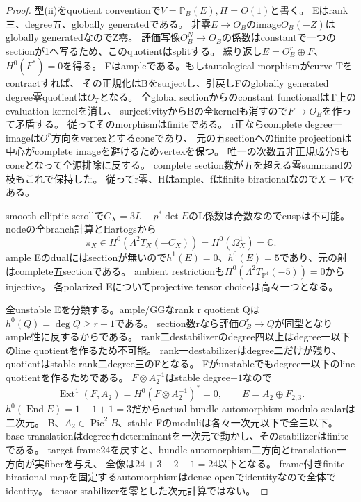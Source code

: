 \documentclass[a4paper,11pt]{ltjsarticle}
\theoremstyle{definition}
\begin{document}
\begin{proof}
型(ii)をquotient conventionで$V=\mathbb P_B(E),H=O(1)$と書く。
Eはrank三、degree五、globally generatedである。
非零$E\to O_B$のimage$O_B(-Z)$はglobally generatedなのでZ零。
評価写像$O_B^N\to O_B$の係数はconstantで一つのsectionが1へ写るため、このquotientはsplitする。
繰り返し$E=O_B^r\oplus F$、$H^0(F^*)=0$を得る。
Fはampleである。もしtautological morphismがcurve Tをcontractすれば、
その正規化はBをsurjectし、引戻しFのglobally generated degree零quotientは$O_T$となる。
全global sectionからのconstant functionalはT上のevaluation kernelを消し、
surjectivityからBの全kernelも消すので$F\to O_B$を作って矛盾する。
従ってそのmorphismはfiniteである。
r正ならcomplete degree一imageは$O^r$方向をvertexとするconeであり、
元の五sectionへのfinite projectionは中心がcomplete imageを避けるためvertexを保つ。
唯一の次数五非正規成分Sもconeとなって全源排除に反する。
complete section数が五を超える零summandの枝もこれで保持した。
従ってr零、Hはample、fはfinite birationalなので$X=V$である。

smooth elliptic scrollで$C_X=3L-p^*\det E$のL係数は奇数なのでcuspは不可能。
nodeの全branch計算とHartogsから
\[
 \pi_X\in H^0(\Lambda^2T_X(-C_X))=H^0(\Omega_X^1)=\mathbb C.
\]
ample Eのdualにはsectionが無いので$h^1(E)=0$、$h^0(E)=5$であり、元の射はcomplete五sectionである。
ambient restrictionも$H^0(\Lambda^2T_{\mathbb P^4}(-5))=0$からinjective。
各polarized Eについてprojective tensor choiceは高々一つとなる。

全unstable Eを分類する。ample/GGなrank r quotient Qは$h^0(Q)=\deg Q\ge r+1$である。
section数rなら評価$O_B^r\to Q$が同型となりample性に反するからである。
rank二destabilizerのdegree四以上はdegree一以下のline quotientを作るため不可能。
rank一destabilizerはdegree二だけが残り、quotientはstable rank二degree三のFとなる。
Fがunstableでもdegree一以下のline quotientを作るためである。
$F\otimes A_2^{-1}$はstable degree$-1$なので
\[
 \operatorname{Ext}^1(F,A_2)=H^0(F\otimes A_2^{-1})^*=0,\qquad
 E=A_2\oplus F_{2,3}.
\]
$h^0(\operatorname{End}E)=1+1+1=3$だからactual bundle automorphism modulo scalarは二次元。
B、$A_2\in\operatorname{Pic}^2B$、stable Fのmoduliは各々一次元以下で全三以下。
base translationはdegree五determinantを一次元で動かし、そのstabilizerはfiniteである。
target frame24を戻すと、bundle automorphism二方向とtranslation一方向が実fiberを与え、
全像は$24+3-2-1=24$以下となる。
frame付きfinite birational mapを固定するautomorphismはdense openでidentityなので全体でidentity。
tensor stabilizerを零とした次元計算ではない。


\end{proof}
\end{document}
